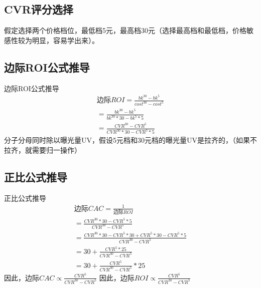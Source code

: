 \subsection{CVR评分选择}
假定选择两个价格档位，最低档5元，最高档30元（选择最高档和最低档，价格敏感性较为明显，容易学出来）。
\subsection{边际ROI公式推导}
边际ROI公式推导
\begin{equation}
    \begin{array}{l}
        边际ROI = \frac{bk^{30} - bk^{5}}{cost^{30} - cost^{5}} \\
        = \frac{bk^{30} - bk^{5}}{bk^{30} * 30 - bk^{5} * 5} \\
        = \frac{CVR^{30} - CVR^{5}}{CVR^{30} * 30 - CVR^{5} * 5}
    \end{array}
\end{equation}
分子分母同时除以曝光量UV，假设5元档和30元档的曝光量UV是拉齐的，（如果不拉齐，就需要归一操作）
\subsection{正比公式推导}
正比公式推导
\begin{equation}
    \begin{array}{l}
        边际CAC = \frac{1}{边际ROI} \\
        = \frac{CVR^{30} * 30 - CVR^{5} * 5}{CVR^{30} - CVR^{5}}    \\
        = \frac{CVR^{30} * 30 - CVR^{5} * 30 + CVR^{5} * 30 - CVR^{5} * 5}{CVR^{30} - CVR^{5}}  \\
        = 30 + \frac{CVR^{5} * 25}{CVR^{30} -CVR^{5}}  \\
        = 30 + \frac{CVR^5}{CVR^{30} - CVR^{5}} * 25
    \end{array}
\end{equation}
因此，$边际CAC \propto \frac{CVR^{5}}{CVR^{30} - CVR^{5}}$
因此，$边际ROI \propto \frac{CVR^{5}}{CVR^{30} - CVR^{5}}$
\newpage
